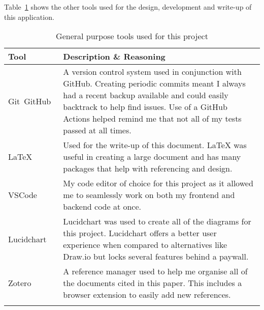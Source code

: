 Table~\ref{tab:tools-other} shows the other tools used for the design, development and write-up of this application.

\begin{longtable}{p{} p{}}
  \toprule
  \textbf{Tool} & \textbf{Description \& Reasoning}
  \\\midrule\midrule
  Git~\cite{noauthor_git_nodate}\newline GitHub~\cite{noauthor_github_nodate}
  & \small A version control system used in conjunction with GitHub. Creating periodic commits meant I always had a recent backup available and could easily backtrack to help find issues.
  Use of a GitHub Actions helped remind me that not all of my tests passed at all times.\\
  LaTeX~\cite{noauthor_latex_nodate}
  & \small Used for the write-up of this document. LaTeX was useful in creating a large document and has many packages that help with referencing and design.\\
  VSCode~\cite{noauthor_visual_nodate}
  & \small My code editor of choice for this project as it allowed me to seamlessly work on both my frontend and backend code at once. \\
  Lucidchart~\cite{noauthor_lucidchart_nodate}
  & \small Lucidchart was used to create all of the diagrams for this project. Lucidchart offers a better user experience when compared to alternatives like Draw.io but locks several features behind a paywall. \\
  Zotero~\cite{noauthor_zotero_nodate}
  & \small A reference manager used to help me organise all of the documents cited in this paper. This includes a browser extension to easily add new references.
  \\\bottomrule\bottomrule
  \caption{General purpose tools used for this project}
  \label{tab:tools-other}
\end{longtable}
